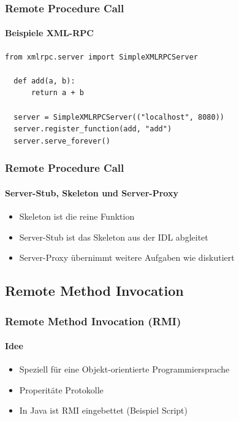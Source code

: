 \begin{frame}[fragile]
  \frametitle{Remote Procedure Call}
  \framesubtitle{Beispiele XML-RPC}
  \begin{minipage}{\textwidth}
  \begin{lstlisting}[caption={XML-RPC in Python},captionpos=b,label={lst:xmp-rpc-python}]
  from xmlrpc.server import SimpleXMLRPCServer

  def add(a, b):
      return a + b

  server = SimpleXMLRPCServer(("localhost", 8080))
  server.register_function(add, "add")
  server.serve_forever()
  \end{lstlisting}
  \end{minipage}
\end{frame}

\begin{frame}
  \frametitle{Remote Procedure Call}
  \framesubtitle{Server-Stub, Skeleton und Server-Proxy}
  \begin{itemize} 
  \item Skeleton ist die reine Funktion
  \item Server-Stub ist das Skeleton aus der IDL abgleitet
  \item Server-Proxy übernimmt weitere Aufgaben wie diskutiert
  \end{itemize} 
\end{frame}
\subsection{Remote Method Invocation}
\begin{frame}
  \frametitle{Remote Method Invocation (RMI) }
  \framesubtitle{Idee}
  \begin{itemize} 
  \item Speziell für eine Objekt-orientierte Programmiersprache 
  \item Properitäte Protokolle
  \item In Java ist RMI eingebettet (Beispiel Script)
  \end{itemize} 
\end{frame}